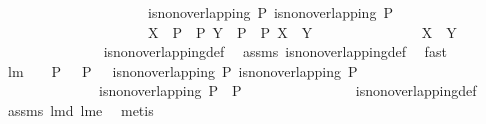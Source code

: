 \begin{isabellebody}
\ \ \ \ \ \ \ \ \ \ \ \ \ \ \ \ \ \ \ \ \ {\isachardoublequoteopen}is{\isacharunderscore}non{\isacharunderscore}overlapping\ P{}{\isachardoublequoteclose}\ {\isachardoublequoteopen}is{\isacharunderscore}non{\isacharunderscore}overlapping\ P{}{\isachardoublequoteclose}\ \isanewline
\ \ \ \ \ \ \ \ \ \ \ \ \ \ \ \ \ \ \ \ \ {\isachardoublequoteopen}X\ {\isasymin}\ P{}\ {\isasymunion}\ P{}{\isachardoublequoteclose}\ {\isachardoublequoteopen}Y\ {\isasymin}\ P{}\ {\isasymunion}\ P{}{\isachardoublequoteclose}\ {\isachardoublequoteopen}{\isacharparenleft}X\ {\isacharequal}\ Y{\isacharparenright}{\isachardoublequoteclose}\ \isanewline
\ \ \ \ \ \ \ \ \ \ \ \ \ \ {\isachardoublequoteopen}X\ {\isasyminter}\ Y\ {\isasymnoteq}\ {\isacharbraceleft}{\isacharbraceright}{\isachardoublequoteclose}\ \isanewline
%
\isadelimproof
\ \ \ \ \ \ \ \ \ \ \ \ \ %
\endisadelimproof
%
\isatagproof
{}\isamarkupfalse%
\ is{\isacharunderscore}non{\isacharunderscore}overlapping{\isacharunderscore}def\ \isamarkupfalse%
\ assms\ is{\isacharunderscore}non{\isacharunderscore}overlapping{\isacharunderscore}def\ \isamarkupfalse%
\ fast%
\endisatagproof
{\isafoldproof}%
%
\isadelimproof
\isanewline
%
\endisadelimproof
\isanewline
{}\isamarkupfalse%
\ lm{}{}{\isacharcolon}\ \ \ {\isachardoublequoteopen}{\isacharparenleft}{\isasymUnion}\ P{}{\isacharparenright}\ {\isasyminter}\ {\isacharparenleft}{\isasymUnion}\ P{}{\isacharparenright}\ {\isacharequal}\ {\isacharbraceleft}{\isacharbraceright}{\isachardoublequoteclose}\ {\isachardoublequoteopen}is{\isacharunderscore}non{\isacharunderscore}overlapping\ P{}{\isachardoublequoteclose}\ {\isachardoublequoteopen}is{\isacharunderscore}non{\isacharunderscore}overlapping\ P{}{\isachardoublequoteclose}\isanewline
\ \ \ \ \ \ \ \ \ \ \ \ \ \ {\isachardoublequoteopen}is{\isacharunderscore}non{\isacharunderscore}overlapping\ {\isacharparenleft}P{}\ {\isasymunion}\ P{}{\isacharparenright}{\isachardoublequoteclose}\ \isanewline
%
\isadelimproof
\ \ \ \ \ \ \ \ \ \ \ \ \ %
\endisadelimproof
%
\isatagproof
{}\isamarkupfalse%
\ is{\isacharunderscore}non{\isacharunderscore}overlapping{\isacharunderscore}def\ \isamarkupfalse%
\ assms\ lm{}{}d\ lm{}{}e\ \isamarkupfalse%
\ metis%

\end{isabellebody}

